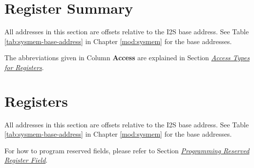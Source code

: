 \documentclass[main\_\_EN.tex]{subfiles}
\begin{document}



\newpage
\hypertarget{i2s-reg-summ}{}
\section{Register Summary}
\label{sec:i2s-reg-summ}

All addresses in this section are offsets relative to the I2S base address. See Table \ref{tab:sysmem-base-address} \textit{} in Chapter \ref{mod:sysmem} \textit{} for the base addresses.

The abbreviations given in Column \textbf{Access} are explained in Section \hyperref[glossary-access-types]{\textit{Access Types for Registers}}.





\newpage
\section{Registers}

All addresses in this section are offsets relative to the I2S base address. See Table \ref{tab:sysmem-base-address} \textit{} in Chapter \ref{mod:sysmem} \textit{} for the base addresses.

For how to program reserved fields, please refer to Section \hyperref[programming-reserved-field]{\textit{Programming Reserved Register Field}}.


\end{document}
